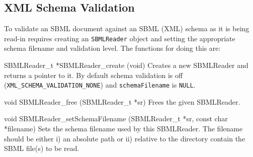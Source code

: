 \documentclass{cekmanual}
\begin{document}
%


\subsection{XML Schema Validation}
\label{sec:schema-validation}

To validate an SBML document against an SBML (XML) schema as it is
being read-in requires creating an \texttt{SBMLReader} object and
setting the appropriate schema filename and validation level.  The
functions for doing this are:


\begin{methoddef}{SBMLReader\_t *SBMLReader\_create (void)}
  Creates a new SBMLReader and returns a pointer to it.  By default
  schema validation is off (\texttt{XML\_SCHEMA\_VALIDATION\_NONE})
  and \texttt{schemaFilename} is \texttt{NULL}.
\end{methoddef}

\begin{methoddef}{void SBMLReader\_free (SBMLReader\_t *sr)}
  Frees the given SBMLReader.
\end{methoddef}

\begin{methoddef}{void SBMLReader\_setSchemaFilename (SBMLReader\_t *sr,
const char *filename)} Sets the schema filename used by this
  SBMLReader.  The filename should be either i) an absolute path or
  ii) relative to the directory contain the SBML file(s) to be read.
\end{methoddef}
\end{document}
